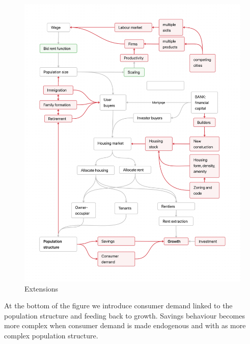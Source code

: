 {\newpage\thispagestyle{empty}
\vspace{-1.5cm}
\begin{figure}
\vspace{-4.5cm}
\begin{adjustwidth}{-0.24\textwidth}{-0.2\textwidth}
\centering
\includegraphics[scale=.22]{fig/extensions-logic.png}
\end{adjustwidth}
\caption{Extensions}
\label{fig-extensions-logic}
\end{figure}}


At the bottom of the figure we introduce consumer demand linked to the population structure and feeding back to growth. Savings behaviour becomes more  complex when consumer demand is made endogenous and with as more complex population structure.

